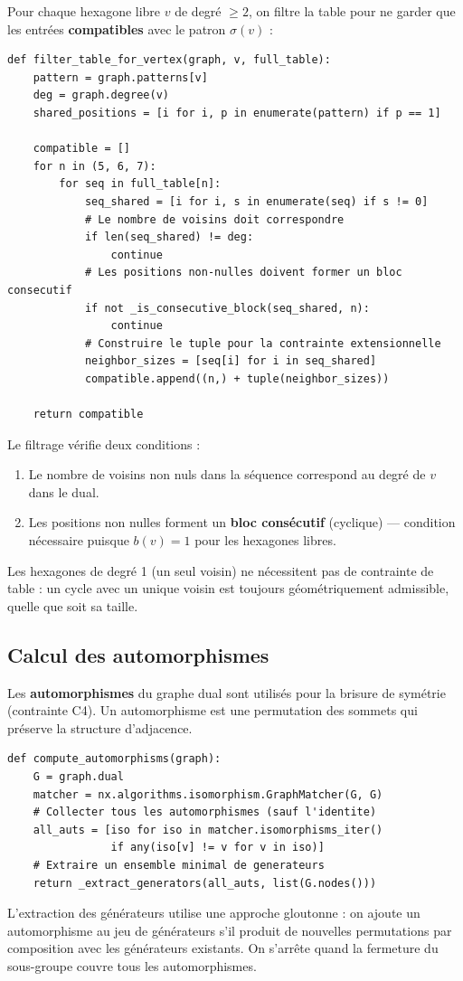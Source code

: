 Pour chaque hexagone libre $v$ de degré $\geq 2$, on filtre la table pour ne garder que les
entrées \textbf{compatibles} avec le patron $\sigma(v)$ :

\begin{lstlisting}
def filter_table_for_vertex(graph, v, full_table):
    pattern = graph.patterns[v]
    deg = graph.degree(v)
    shared_positions = [i for i, p in enumerate(pattern) if p == 1]

    compatible = []
    for n in (5, 6, 7):
        for seq in full_table[n]:
            seq_shared = [i for i, s in enumerate(seq) if s != 0]
            # Le nombre de voisins doit correspondre
            if len(seq_shared) != deg:
                continue
            # Les positions non-nulles doivent former un bloc consecutif
            if not _is_consecutive_block(seq_shared, n):
                continue
            # Construire le tuple pour la contrainte extensionnelle
            neighbor_sizes = [seq[i] for i in seq_shared]
            compatible.append((n,) + tuple(neighbor_sizes))

    return compatible
\end{lstlisting}

Le filtrage vérifie deux conditions :
\begin{enumerate}
  \item Le nombre de voisins non nuls dans la séquence correspond au degré de $v$ dans le dual.
  \item Les positions non nulles forment un \textbf{bloc consécutif} (cyclique) — condition
    nécessaire puisque $b(v) = 1$ pour les hexagones libres.
\end{enumerate}

\begin{remarque}
  Les hexagones de degré 1 (un seul voisin) ne nécessitent pas de contrainte de table :
  un cycle avec un unique voisin est toujours géométriquement admissible, quelle que soit
  sa taille.
\end{remarque}

\subsection{Calcul des automorphismes}

Les \textbf{automorphismes} du graphe dual sont utilisés pour la brisure de symétrie
(contrainte C4). Un automorphisme est une permutation des sommets qui préserve la structure
d'adjacence.

\begin{lstlisting}
def compute_automorphisms(graph):
    G = graph.dual
    matcher = nx.algorithms.isomorphism.GraphMatcher(G, G)
    # Collecter tous les automorphismes (sauf l'identite)
    all_auts = [iso for iso in matcher.isomorphisms_iter()
                if any(iso[v] != v for v in iso)]
    # Extraire un ensemble minimal de generateurs
    return _extract_generators(all_auts, list(G.nodes()))
\end{lstlisting}

L'extraction des générateurs utilise une approche gloutonne : on ajoute un automorphisme au
jeu de générateurs s'il produit de nouvelles permutations par composition avec les générateurs
existants. On s'arrête quand la fermeture du sous-groupe couvre tous les automorphismes.
